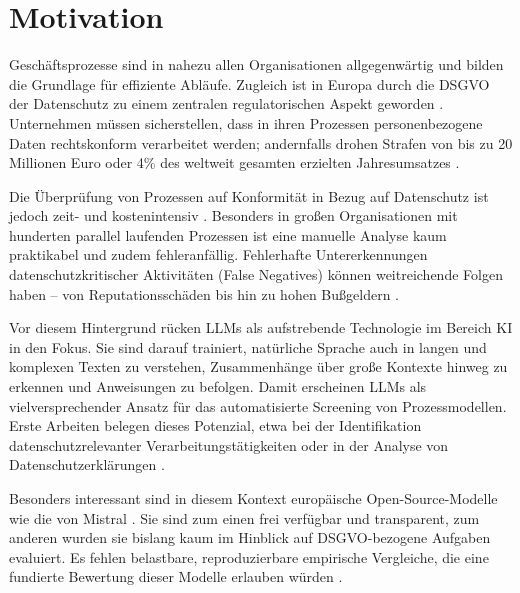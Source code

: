 \section{Motivation}\label{sec:motivation}

Geschäftsprozesse sind in nahezu allen Organisationen allgegenwärtig und bilden die Grundlage für effiziente Abläufe. Zugleich ist in Europa durch die \ac{DSGVO} der Datenschutz zu einem zentralen regulatorischen Aspekt geworden \cite{Capodieci2023BPMNEnabledDP, GDPR2016}. Unternehmen müssen sicherstellen, dass in ihren Prozessen personenbezogene Daten rechtskonform verarbeitet werden; andernfalls drohen Strafen von bis zu 20 Millionen Euro oder 4\% des weltweit gesamten erzielten Jahresumsatzes \cite{GDPR2016}.


Die Überprüfung von Prozessen auf Konformität in Bezug auf Datenschutz ist jedoch zeit- und kostenintensiv \cite{nake2023towards, varela2025business}. Besonders in großen Organisationen mit hunderten parallel laufenden Prozessen ist eine manuelle Analyse kaum praktikabel und zudem fehleranfällig. Fehlerhafte Untererkennungen datenschutzkritischer Aktivitäten (False Negatives) können weitreichende Folgen haben – von Reputationsschäden bis hin zu hohen Bußgeldern \cite{nake2023towards}.


Vor diesem Hintergrund rücken \acp{LLM} als aufstrebende Technologie im Bereich \ac{KI} in den Fokus. Sie sind darauf trainiert, natürliche Sprache auch in langen und komplexen Texten zu verstehen, Zusammenhänge über große Kontexte hinweg zu erkennen und Anweisungen zu befolgen. Damit erscheinen \acp{LLM} als vielversprechender Ansatz für das automatisierte Screening von Prozessmodellen. Erste Arbeiten belegen dieses Potenzial, etwa bei der Identifikation datenschutzrelevanter Verarbeitungstätigkeiten oder in der Analyse von Datenschutzerklärungen \cite{ciaramella2022leveraging, pragyan2024toward}.


Besonders interessant sind in diesem Kontext europäische Open-Source-Modelle wie die von Mistral \cite{mistralai}. Sie sind zum einen frei verfügbar und transparent, zum anderen wurden sie bislang kaum im Hinblick auf \ac{DSGVO}-bezogene Aufgaben evaluiert. Es fehlen belastbare, reproduzierbare empirische Vergleiche, die eine fundierte Bewertung dieser Modelle erlauben würden \cite{schwerin2024systematic}.


